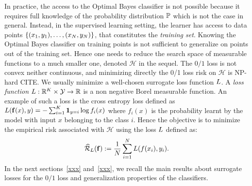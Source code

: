 In practice, the access to the Optimal Bayes  classifier is not possible because it requires full knowledge of the probability distribution $\mathbb{P}$ which is not the case in general. Instead, in the supervised learning setting, the learner has access to data points $\{(x_1,y_1),\dots,(x_N,y_N)\}$, that constitutes the \emph{training set}. Knowing the Optimal Bayes classifier on training points is not sufficient to generalize on points out of the training set. Hence one needs to reduce the search space of measurable functions to a much smaller one, denoted $\mathcal{H}$ in the sequel. The $0/1$ loss is not convex neither continuous, and minimizing directly the 0/1 loss risk  on $\mathcal{H}$ is  NP-hard CITE. We usually minimize a well-chosen surrogate loss function $L$. A \textit{loss function} $L:\mathbb{R}^K\times\mathcal{Y}\to\mathbb{R}$ is a non negative Borel measurable function. An example of such a loss is the cross entropy loss defined as $L(\mathbf{f}(x),y)=-\sum_{i=1}^K \mathbf{1}_{y=i}\log f_i(x)$
where $f_i(x)$ is the probability learnt by the model with input $x$ belonging to the class $i$. Hence the objective is to minimize the empirical risk associated with $\mathcal{H}$ using the loss $L$  defined as:
\begin{align*}
\widehat{\mathcal{R}}_{L}(\mathbf{f}):= \frac{1}{N}\sum_{i=1}^N L(f(x_i),y_i).
\end{align*}
In the next sections~\ref{xxx} and~\ref{xxx}, we recall the main results about surrogate losses for the $0/1$ loss and generalization properties of the classifiers.



